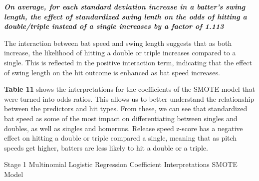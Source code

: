 \documentclass[
  letterpaper,
  DIV=11,
  numbers=noendperiod]{scrartcl}
\begin{document}
\textbf{\emph{On average, for each standard deviation increase in a
batter's swing length, the effect of standardized swing lenth on the
odds of hitting a double/triple instead of a single increases by a
factor of 1.113}}

The interaction between bat speed and swing length suggests that as both
increase, the likelihood of hitting a double or triple increases
compared to a single. This is reflected in the positive interaction
term, indicating that the effect of swing length on the hit outcome is
enhanced as bat speed increases.

\textbf{Table 11} shows the interpretations for the coefficients of the
SMOTE model that were turned into odds ratios. This allows us to better
understand the relationship between the predictors and hit types. From
these, we can see that standardized bat speed as some of the most impact
on differentiating between singles and doubles, as well as singles and
homeruns. Release speed z-score has a negative effect on hitting a
double or triple compared a single, meaning that as pitch speeds get
higher, batters are less likely to hit a double or a triple.

\newpage

\begin{table}

\caption{\label{tbl-11}Stage 1 Multinomial Logistic Regression
Coefficient Interpretations SMOTE Model}


\end{table}%
\end{document}
